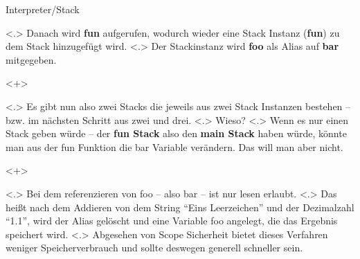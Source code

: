 \begin{frame}{Interpreter/Stack}
\begin{uncoverenv}
%
    \end{uncoverenv}%
        \note[item]<.>{
          Danach wird \textbf{fun} aufgerufen, wodurch wieder eine Stack Instanz (\textbf{fun}) zu dem Stack hinzugefügt wird.
        }
        \note[item]<.>{
          Der Stackinstanz wird \textbf{foo} als Alias auf \textbf{bar} mitgegeben.
        }
    \begin{uncoverenv}<+>%
    \end{uncoverenv}%
        \note[item]<.>{
          Es gibt nun also zwei Stacks die jeweils aus zwei Stack Instanzen bestehen -- bzw. im nächsten Schritt aus zwei und drei.
        }
        \note[item]<.>{
          Wieso?
        }
        \note[item]<.>{
          Wenn es nur einen Stack geben würde -- der \textbf{fun Stack} also den \textbf{main Stack} haben würde, könnte man aus der fun Funktion die bar Variable verändern. Das will man aber nicht.
        }
    \begin{uncoverenv}<+>%
    \end{uncoverenv}%
        \note[item]<.>{
          Bei dem referenzieren von foo -- also bar -- ist nur lesen erlaubt.
        }
        \note[item]<.>{
          Das heißt nach dem Addieren von dem String ``Eins Leerzeichen'' und der Dezimalzahl ``1.1'', wird der Alias gelöscht und eine Variable foo angelegt, die das Ergebnis speichert wird.
        }
        \note[item]<.>{
          Abgesehen von Scope Sicherheit bietet dieses Verfahren weniger Speicherverbrauch und sollte deswegen generell schneller sein.
}
\end{frame}
